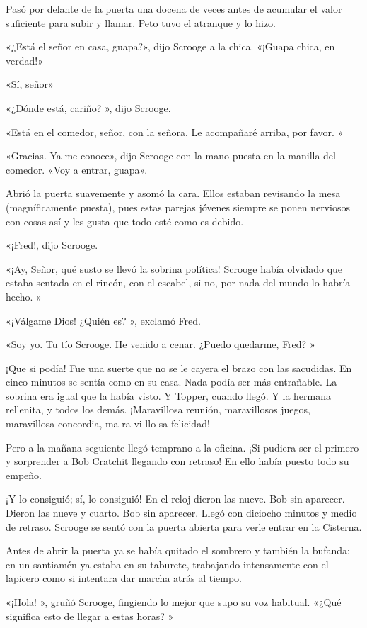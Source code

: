 \documentclass{novela}
\begin{document}
 Pasó por delante de la puerta una docena de veces antes de acumular el valor suficiente para subir y llamar. Peto tuvo el atranque y lo hizo.

 «¿Está el señor en casa, guapa?», dijo Scrooge a la chica. «¡Guapa chica, en verdad!»

 «Sí, señor»

 «¿Dónde está, cariño? », dijo Scrooge.

 «Está en el comedor, señor, con la señora. Le acompañaré arriba, por favor. »

 «Gracias. Ya me conoce», dijo Scrooge con la mano puesta en la manilla del comedor. «Voy a entrar, guapa».

 Abrió la puerta suavemente y asomó la cara. Ellos estaban revisando la mesa (magníficamente puesta), pues estas parejas jóvenes siempre se ponen nerviosos con cosas así y les gusta que todo esté como es debido.

 «¡Fred!, dijo Scrooge.

 «¡Ay, Señor, qué susto se llevó la sobrina política! Scrooge había olvidado que estaba sentada en el rincón, con el escabel, si no, por nada del mundo lo habría hecho. »

 «¡Válgame Dios! ¿Quién es? », exclamó Fred.

 «Soy yo. Tu tío Scrooge. He venido a cenar. ¿Puedo quedarme, Fred? »

 ¡Que si podía! Fue una suerte que no se le cayera el brazo con las sacudidas. En cinco minutos se sentía como en su casa. Nada podía ser más entrañable. La sobrina era igual que la había visto. Y Topper, cuando llegó. Y la hermana rellenita, y todos los demás. ¡Maravillosa reunión, maravillosos juegos, maravillosa concordia, ma-ra-vi-llo-sa felicidad!

 Pero a la mañana seguiente llegó temprano a la oficina. ¡Si pudiera ser el primero y sorprender a Bob Cratchit llegando con retraso! En ello había puesto todo su empeño.

 ¡Y lo consiguió; sí, lo consiguió! En el reloj dieron las nueve. Bob sin aparecer. Dieron las nueve y cuarto. Bob sin aparecer. Llegó con diciocho minutos y medio de retraso. Scrooge se sentó con la puerta abierta para verle entrar en la Cisterna.

 Antes de abrir la puerta ya se había quitado el sombrero y también la bufanda; en un santiamén ya estaba en su taburete, trabajando intensamente con el lapicero como si intentara dar marcha atrás al tiempo.

 «¡Hola! », gruñó Scrooge, fingiendo lo mejor que supo su voz habitual. «¿Qué significa esto de llegar a estas horas? »
\end{document}
